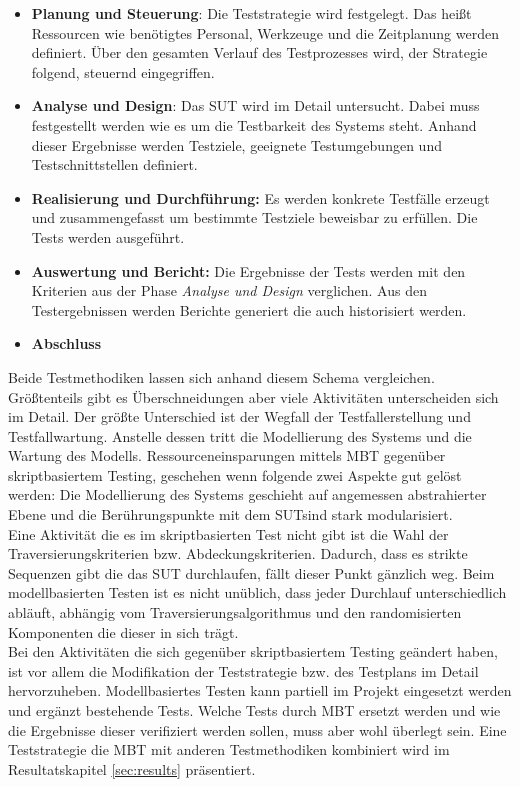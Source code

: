 \begin{itemize}
\item \textbf{Planung und Steuerung}: Die Teststrategie wird festgelegt. Das heißt Ressourcen wie benötigtes Personal, Werkzeuge und die Zeitplanung werden definiert. Über den gesamten Verlauf des Testprozesses wird, der Strategie folgend, steuernd eingegriffen.
\item \textbf{Analyse und Design}: Das \Gls{SUT} wird im Detail untersucht. Dabei muss festgestellt werden wie es um die Testbarkeit des Systems steht. Anhand dieser Ergebnisse werden Testziele, geeignete Testumgebungen und Testschnittstellen definiert.
\item \textbf{Realisierung und Durchführung:} Es werden konkrete Testfälle erzeugt und zusammengefasst um bestimmte Testziele beweisbar zu erfüllen. Die Tests werden ausgeführt.
\item \textbf{Auswertung und Bericht:} Die Ergebnisse der Tests werden mit den Kriterien aus der Phase \textit{Analyse und Design} verglichen. Aus den Testergebnissen werden Berichte generiert die auch historisiert werden.
\item \textbf{Abschluss}
\end{itemize}

Beide Testmethodiken lassen sich anhand diesem Schema vergleichen. Größtenteils gibt es Überschneidungen aber viele Aktivitäten unterscheiden sich im Detail. Der größte Unterschied ist der Wegfall der Testfallerstellung und Testfallwartung. Anstelle dessen tritt die Modellierung des Systems und die Wartung des Modells. Ressourceneinsparungen mittels \Gls{MBT} gegenüber skriptbasiertem Testing, geschehen wenn folgende zwei Aspekte gut gelöst werden: Die Modellierung des Systems geschieht auf angemessen abstrahierter Ebene und die Berührungspunkte mit dem \Gls{SUT}sind stark modularisiert\cite{utting_practical_2007}.\\
Eine Aktivität die es im skriptbasierten Test nicht gibt ist die Wahl der Traversierungskriterien bzw. Abdeckungskriterien. Dadurch, dass es strikte Sequenzen gibt die das \Gls{SUT} durchlaufen, fällt dieser Punkt gänzlich weg. Beim modellbasierten Testen ist es nicht unüblich, dass jeder Durchlauf unterschiedlich abläuft, abhängig vom Traversierungsalgorithmus und den randomisierten Komponenten die dieser in sich trägt.\\
Bei den Aktivitäten die sich gegenüber skriptbasiertem Testing geändert haben, ist vor allem die Modifikation der Teststrategie bzw. des Testplans im Detail hervorzuheben. Modellbasiertes Testen kann partiell im Projekt eingesetzt werden und ergänzt bestehende Tests. Welche Tests durch \Gls{MBT} ersetzt werden und wie die Ergebnisse dieser verifiziert werden sollen, muss aber wohl überlegt sein. Eine Teststrategie die \Gls{MBT} mit anderen Testmethodiken kombiniert wird im Resultatskapitel \ref{sec:results} präsentiert.

